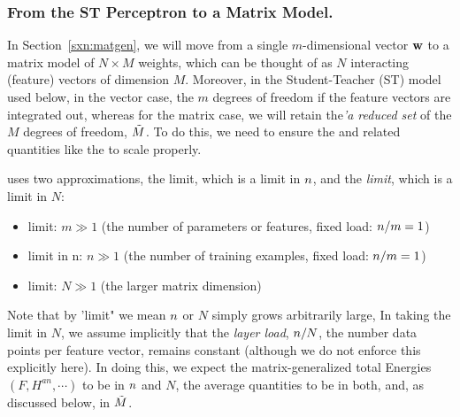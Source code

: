 \subsubsection{From the ST Perceptron to a Matrix Model.} 
\label{sxn:from_vectors}
In Section~\ref{sxn:matgen}, we will move from a single $m$-dimensional \Perceptron vector ${\mathbf{w}}$ 
to a matrix model of $N \times M$ weights, which can be thought of
as $N$ interacting (feature) vectors of dimension $M$.
Moreover, in the Student-Teacher (ST) model used below,
in the vector case, the $m$ degrees of freedom if the feature vectors are integrated out,
whereas for the matrix case, we will retain the\emph{'a reduced set} of the  $M$ degrees of freedom, $\tilde{M}$.  To do this, we need to ensure the \FreeEnergies and related quantities like the \LayerQualitySquared to scale properly.

\SETOL uses two \LargeN approximations, the \Thermodynamic limit, which is a \LargeN limit in $n$, and the \emph{\WideLayer limit}, which is a \LargeN limit in $N$:
\begin{itemize}
    \item \Thermodynamic limit: $m \gg 1$ (the number of parameters or features, fixed load: $n/m = 1$)
    \item \LargeN limit in n: $n\gg 1$ (the number of training examples, fixed load: $n/m = 1$)
    \item \WideLayer limit: $N\gg 1$ (the larger matrix dimension)
\end{itemize}
Note that by 'limit" we mean $n$ or $N$ simply grows arbitrarily large,  In taking the \WideLayer \LargeN limit in $N$, we assume implicitly that  the \emph{layer load}, $n/N$, the number data points per feature vector, remains constant (although we do not enforce this explicitly here).  
In doing this, we expect the matrix-generalized total Energies $(F, H^{an}, \cdots)$ to be \SizeExtensive in $n$ and $N$,  the average quantities to be \SizeIntensive in both, 
and, as discussed below, \emph{\SizeConsistent} in $\tilde{M}$.

